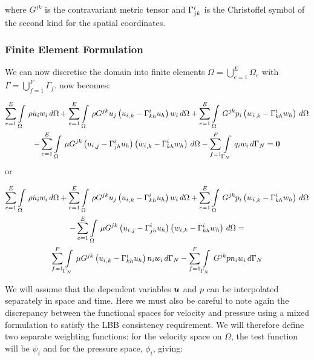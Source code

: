 where $G^{jk}$ is the contravariant metric tensor and
$ \Gamma^{i}_{jk} $ is the Christoffel symbol of the second kind for the spatial coordinates.

\subsubsection{Finite Element Formulation}

We can now discretise the domain into finite elements \ie $\Omega=\displaystyle{\bigcup_{e=1}^{E}}\Omega_{e}$ with $\Gamma=\displaystyle{\bigcup_{f=1}^{F}}\Gamma_{f}$.  now becomes:

\begin{multline}
 \label{FEMNSE}
  \dsum_{e=1}^{E}\gint{\Omega}{}{\rho\dot{u}_{i}w_{i}}{\Omega}
 +\dsum_{e=1}^{E}\gint{\Omega}{}{{\rho}G^{jk}{u_j}\pbrac{\partialderiv{u_{i}}{k}-\christoffel{i}{k}{h}u_h}{w_{i}}}{\Omega}
 +\dsum_{e=1}^{E}\gint{\Omega}{}{G^{jk}{p_{i}}\pbrac{\partialderiv{w_{i}}{k}-\christoffel{i}{k}{h}w_h}}{\Omega}\\
 -\dsum_{e=1}^{E}\gint{\Omega}{}{{\mu}G^{jk}\pbrac{\partialderiv{u_{i}}{j}-\christoffel{i}{j}{h}u_h}\pbrac{\partialderiv{w_{i}}{k}-\christoffel{i}{k}{h}w_h}}{\Omega}
 -\dsum_{f=1}^{F}\gint{\Gamma_N}{}{{q_{i}}{w_i}}{\Gamma_N}=\vect{0}
\end{multline} 
or


\begin{multline}
 \label{FEMNSE2}
  \displaystyle\sum_{e=1}^{E}  \displaystyle\int\limits_{\Omega}^{} \,\rho\dot{u}_{i}w_{i}\,d\Omega 
 +\displaystyle\sum_{e=1}^{E}  \displaystyle\int\limits_{\Omega}^{} \,{\rho}G^{jk}{u_j}\left(  {u_{i}}_{,k} - \Gamma^{i}_{kh} u_h \right){w_{i}}\,d\Omega 
 +\displaystyle\sum_{e=1}^{E}  \displaystyle\int\limits_{\Omega}^{} \,G^{jk}{p_{i}}\left(  {w_{i}}_{,k} - \Gamma^{i}_{kh} w_h \right)\,d\Omega \\
 -\displaystyle\sum_{e=1}^{E}  \displaystyle\int\limits_{\Omega}^{} \,{\mu}G^{jk}\left(  {u_{i}}_{,j} - \Gamma^{i}_{jh} u_h \right)\left(  {w_{i}}_{,k} - \Gamma^{i}_{kh} w_h \right)\,d\Omega =\\
 \displaystyle\sum_{f=1}^{F}  \displaystyle\int\limits_{\Gamma_N}^{} \,{\mu}G^{jk}\left(  {u_{i}}_{,k} - \Gamma^{i}_{kh} u_h \right){n_{i}}{w_{i}}\,d\Gamma_N 
-\displaystyle\sum_{f=1}^{F}  \displaystyle\int\limits_{\Gamma_N}^{} \,G^{jk}{p}{n_i}{w_i}\,d\Gamma_N 
\end{multline} 


We will assume that the dependent variables $\vect{u}$ and $p$ can be
interpolated separately in space and time. Here we must also be
careful to note again the discrepancy between the functional
spaces for velocity and pressure using a mixed formulation to satisfy the LBB
consistency requirement. We will therefore define two separate weighting functions: for the velocity space on $\Omega$, the test function will be $\psi_i$ and for the pressure space, $\phi_i$,
giving:

